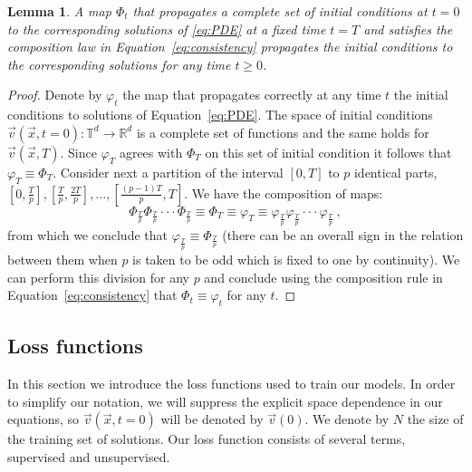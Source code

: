 \documentclass{article}
\theoremstyle{plain}
\newtheorem{lemma}[theorem]{Lemma}
\theoremstyle{definition}
\theoremstyle{remark}
\begin{document}
\begin{lemma}

A map $\Phi_t$ that propagates a complete set of initial conditions at $t=0$  to the corresponding solutions of 
\eqref{eq:PDE} at a fixed time $t=T$ and satisfies the composition law  
in Equation~\eqref{eq:consistency} propagates the initial conditions to the corresponding solutions 
for any time $t \geq 0$.

\end{lemma}


\begin{proof}


Denote by $\varphi_t$ the map that propagates correctly at any time $t$ the initial conditions 
to solutions of Equation~\eqref{eq:PDE}. 
The space of initial conditions 
$\vec{v}(\vec{x}, t=0): {\mathbb T}^d \rightarrow {\mathbb R}^d$
is a complete set of functions and the same holds for $\vec{v}(\vec{x},T)$.
Since $\varphi_T$ agrees with $\Phi_T$ on this set of initial condition it follows that $\varphi_T \equiv \Phi_T$.
Consider next a partition of the interval $[0,T]$ to $p$ identical parts,
$[0,\frac{T}{p}], [\frac{T}{p},\frac{2T}{p}],..., [\frac{(p-1)T}{p},T]$.
We have the composition of maps:
\begin{equation} 
\Phi_{\frac{T}{p}} \Phi_{\frac{T}{p}}\cdot\cdot\cdot \Phi_{\frac{T}{p}} \equiv \Phi_T \equiv  \varphi_T \equiv \varphi_{\frac{T}{p}}\varphi_{\frac{T}{p}}\cdot\cdot\cdot \varphi_{\frac{T}{p}} \ ,
\end{equation}
from which we conclude that $\varphi_{\frac{T}{p}} \equiv \Phi_{\frac{T}{p}}$ (there can be an overall sign in the relation between them when $p$ is taken to be odd which is fixed to one by continuity).
We can perform this division for any $p$ and conclude using the composition rule
in Equation~\eqref{eq:consistency} that $\Phi_t \equiv \varphi_t$ for any $t$.
\end{proof}


\subsection{Loss functions}
\label{sub:loss}


In this section we introduce the loss functions used to train our models. In order to simplify our notation, we will suppress the explicit space dependence in our equations, so $\vec{v}(\vec{x}, t=0)$ will be denoted by $\vec{v}(0)$.
We denote by $N$ the size of the training set of solutions.
Our loss function consists of several terms, supervised and unsupervised.
\end{document}
